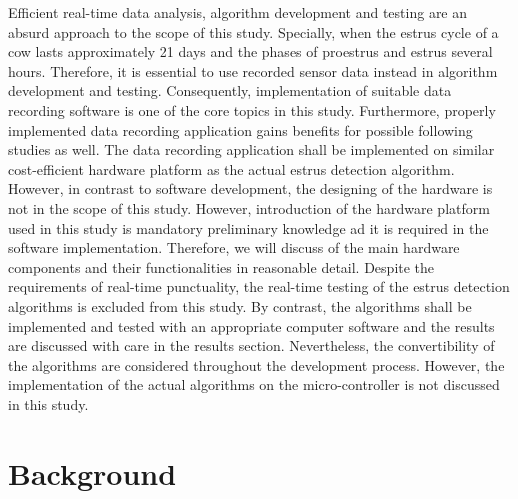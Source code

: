 \documentclass[english,12pt,a4paper,pdftex,elec,utf8]{aaltothesis}
\begin{document}
Efficient real-time data analysis, algorithm development and testing are an absurd approach to the scope of this study. Specially, when the estrus cycle of a cow lasts approximately 21 days and the phases of proestrus and estrus several hours. Therefore, it is essential to use recorded sensor data instead in algorithm development and testing. Consequently, implementation of suitable data recording software is one of the core topics in this study. Furthermore, properly implemented data recording application gains benefits for possible following studies as well. The data recording application shall be implemented on similar cost-efficient hardware platform as the actual estrus detection algorithm. However, in contrast to software development, the designing of the hardware is not in the scope of this study. However, introduction of the hardware platform used in this study is mandatory preliminary knowledge ad it is required in the software implementation. Therefore, we will discuss of the main hardware components and their functionalities in reasonable detail. Despite the requirements of real-time punctuality, the real-time testing of the estrus detection algorithms is excluded from this study. By contrast, the algorithms shall be implemented and tested with an appropriate computer software  and the results are discussed with care in the results section. Nevertheless, the convertibility of the algorithms are considered throughout the development process. However, the implementation of the actual algorithms on the micro-controller is not discussed in this study.


%
%
%
%



\clearpage 

\section{Background} \label{backgroundsection}
 
\end{document}

